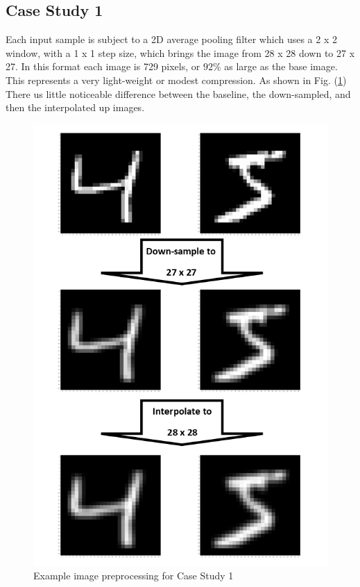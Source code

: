 \documentclass{IEEEtran}
\begin{document}
\subsection{Case Study 1}
Each input sample is subject to a 2D average pooling filter which uses a 2 x 2 window, with a 1 x 1 step size, which brings the image from 28 x 28 down to 27 x 27. In this format each image is 729 pixels, or $92\%$ as large as the base image. This represents a very light-weight or modest compression. As shown in Fig. (\ref{fig:caseStudy1}) There us little noticeable difference between the baseline, the down-sampled, and then the interpolated up images.
\begin{figure}[!h]
    \centering
    \includegraphics[scale=0.5]{fig/caseStudy1.png}
    \caption{Example image preprocessing for Case Study 1}
    \label{fig:caseStudy1}
\end{figure}
\end{document}
